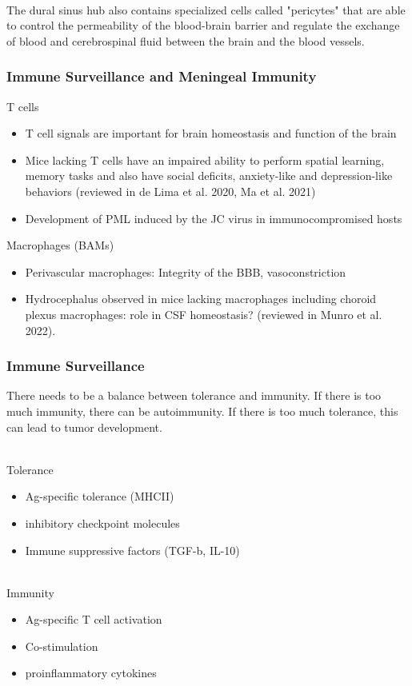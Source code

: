 \begin{itemize}
\begin{itemize}
\\The dural sinus hub also contains specialized cells called "pericytes" that are able to control the permeability of the blood-brain barrier and regulate the exchange of blood and cerebrospinal fluid between the brain and the blood vessels.
\subsubsection{Immune Surveillance and Meningeal Immunity}
T cells
\begin{itemize}
    \item T cell signals are important for brain homeostasis and function of the brain
\item Mice lacking T cells have an impaired ability to perform spatial learning, memory tasks and also have social deficits, anxiety-like and depression-like behaviors (reviewed in de Lima et al. 2020, Ma et al. 2021)
\item Development of PML induced by the JC virus in immunocompromised hosts
\end{itemize}

Macrophages (BAMs)
\begin{itemize}
    \item  Perivascular macrophages: Integrity of the BBB, vasoconstriction
\item Hydrocephalus observed in mice lacking macrophages including choroid plexus
macrophages: role in CSF homeostasis? (reviewed in Munro et al. 2022).
\end{itemize}

\subsubsection{Immune Surveillance}
There needs to be a balance between tolerance and immunity. If there is too much immunity, there can be autoimmunity. If there is too much tolerance, this can lead to tumor development. 

\\Tolerance
\begin{itemize}
    \item Ag-specific tolerance (MHCII) 
    \item inhibitory checkpoint molecules
    \item Immune suppressive factors (TGF-b, IL-10)
\end{itemize}
\\Immunity
\begin{itemize}
    \item Ag-specific T cell activation
    \item Co-stimulation
    \item proinflammatory cytokines
\end{itemize}

\end{itemize}
\end{itemize}
